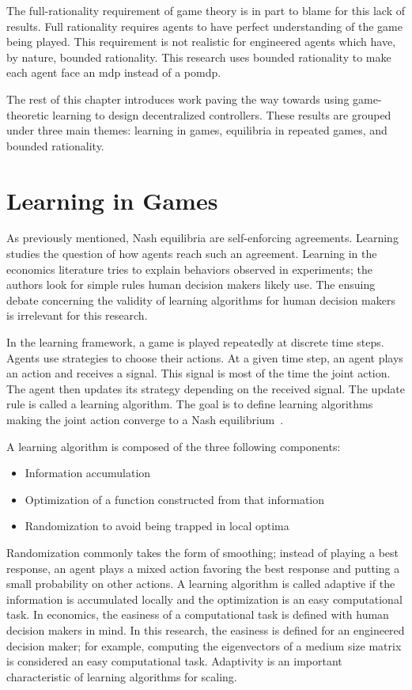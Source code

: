 The full-rationality requirement of game theory is in part to blame for this lack of results.
Full rationality requires agents to have perfect understanding of the game being played.
This requirement is not realistic for engineered agents which have, by nature, bounded rationality.
This research uses bounded rationality to make each agent face an \ac{mdp} instead of a \ac{pomdp}.

The rest of this chapter introduces work paving the way towards using game-theoretic learning to design decentralized controllers.
These results are grouped under three main themes: learning in games, equilibria in repeated games, and bounded rationality.

\section{Learning in Games}
As previously mentioned, Nash equilibria are self-enforcing agreements.
Learning studies the question of how agents reach such an agreement.
Learning in the economics literature tries to explain behaviors observed in experiments; the authors look for simple rules human decision makers likely use.
The ensuing debate concerning the validity of learning algorithms for human decision makers is irrelevant for this research.

In the learning framework, a game is played repeatedly at discrete time steps.
Agents use strategies to choose their actions.
At a given time step, an agent plays an action and receives a signal.
This signal is most of the time the joint action.
The agent then updates its strategy depending on the received signal.
The update rule is called a learning algorithm.
The goal is to define learning algorithms making the joint action converge to a Nash equilibrium~\cite{fudenberg_levine:1998}.

A learning algorithm is composed of the three following components:
\begin{itemize}
\item Information accumulation
\item Optimization of a function constructed from that information
\item Randomization to avoid being trapped in local optima
\end{itemize}
Randomization commonly takes the form of smoothing; instead of playing a best response, an agent plays a mixed action favoring the best response and putting a small probability on other actions.
A learning algorithm is called adaptive if the information is accumulated locally and the optimization is an easy computational task.
In economics, the easiness of a computational task is defined with human decision makers in mind.
In this research, the easiness is defined for an engineered decision maker; for example, computing the eigenvectors of a medium size matrix is considered an easy computational task.
Adaptivity is an important characteristic of learning algorithms for scaling.

